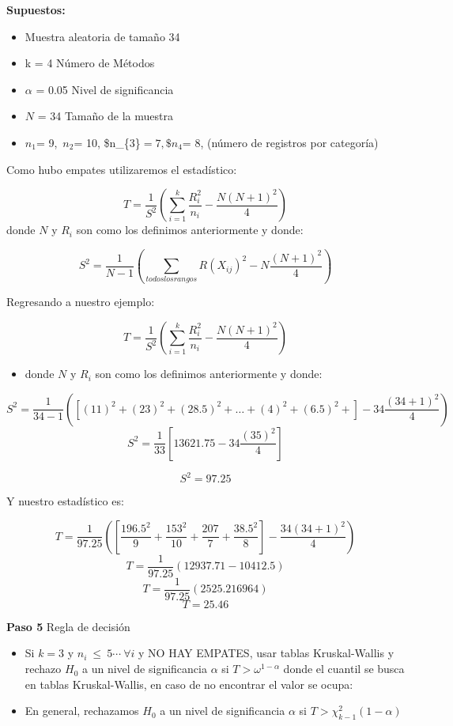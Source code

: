 \documentclass[
  a4paper,
  oneside,
  openany]{book}
\providecommand{\tightlist}{%
  \setlength{\itemsep}{0pt}\setlength{\parskip}{0pt}}
\begin{document}
\textbf{Supuestos:}

\begin{itemize}
\tightlist
\item
  Muestra aleatoria de tamaño 34
\item
  k = 4 Número de Métodos
\item
  \(\alpha\) = 0.05 Nivel de significancia
\item
  \(N\) = 34 Tamaño de la muestra
\item
  \(n_{1}\)= 9,~\(n_{2}\)= 10, \$n\_\{3\}\(=7, \$n_{4}\)= 8, (número de registros por categoría)
\end{itemize}

Como hubo empates utilizaremos el estadístico:

\[T= \frac{1}{S^2}\left(\sum_{i=1}^{k}\frac{R^2_{i}}{n_{i}}-\frac{N(N+1)^2}{4}\right)\]
donde \(N\) y \(R_{i}\) son como los definimos anteriormente y donde:

\[ S^2 = \frac{1}{N-1}\left(\sum_{todos los rangos}R(X_{ij})^2-N\frac{(N+1)^2}{4}\right)\]

Regresando a nuestro ejemplo:

\[T= \frac{1}{S^2}\left(\sum_{i=1}^{k}\frac{R^2_{i}}{n_{i}}-\frac{N(N+1)^2}{4}\right)\]

\begin{itemize}
\tightlist
\item
  donde \(N\) y \(R_{i}\) son como los definimos anteriormente y donde:
\end{itemize}

\[ S^2 = \frac{1}{34-1}\left(\left[(11)^2+(23)^2+(28.5)^2+\ldots+(4)^2+(6.5)^2+\right]-34\frac{(34+1)^2}{4}\right)\]
\[S^2 = \frac{1}{33}\left[13621.75-34\frac{(35)^2}{4}\right]\]

\[S^2 = 97.25\]

Y nuestro estadístico es:

\[T= \frac{1}{97.25}\left(\left[\frac{196.5^2}{9}+\frac{153^2}{10}+\frac{207}{7}+\frac{38.5^2}{8}\right]-\frac{34(34+1)^2}{4}\right)\]
\[T= \frac{1}{97.25}\left(12937.71-10412.5\right)\]
\[T= \frac{1}{97.25}\left(2525.216964\right)\]
\[T= 25.46\]

\textbf{Paso 5} Regla de decisión

\begin{itemize}
\item
  Si \(k =3\) y \(n_{i} \ \leq \ 5 \cdots \ \forall i\) y NO HAY EMPATES, usar tablas Kruskal-Wallis y rechazo \(H_0\) a un nivel de significancia \(\alpha\) si \(T > \omega^{1-\alpha}\) donde el cuantil se busca en tablas Kruskal-Wallis, en caso de no encontrar el valor se ocupa:
\item
  En general, rechazamos \(H_0\) a un nivel de significancia \(\alpha\) si \(T > \chi_{k-1}^2(1- \alpha)\)
\end{itemize}
\end{document}
